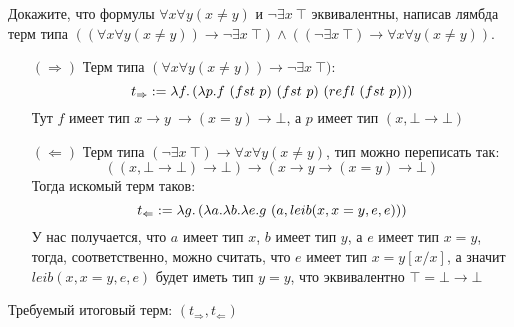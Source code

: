 \begin{task}[4]
Докажите, что формулы $\forall x \forall y (x \neq y)$ и $\neg \exists x\ \top$ эквивалентны,
написав лямбда терм типа $((\forall x \forall y (x \neq y)) \to \neg \exists x\ \top) \land ((\neg \exists x\ \top) \to \forall x \forall y (x \neq y))$.
\end{task}
\begin{solution}
\begin{enumerate}
	\item[$(\Rightarrow)$] Терм типа $(\forall x \forall y (x \neq y)) \to \neg \exists x\ \top)$:
	\[
		t_{\Rightarrow} := \lambda f.\left( \lambda p. f\ (fst\ p)\ (fst\ p)\ (refl\ (fst\ p)) \right)
	\]
	Тут $f$ имеет тип $x \to y\ \to (x = y) \to \bot$, а $p$ имеет тип $(x, \bot \to \bot)$

	\item[$(\Leftarrow)$] Терм типа $(\neg \exists x\ \top) \to \forall x \forall y (x \neq y)$, тип можно переписать так: 
	\[
		((x, \bot \to \bot) \to \bot) \to (x \to y \to (x = y) \to \bot)
	\]
	Тогда искомый терм таков:
	\[
		t_{\Leftarrow} := \lambda g.\left(  \lambda a.\lambda b.\lambda e. g\ (a, leib(x, x=y, e, e)) \right)
	\]
	У нас получается, что $a$ имеет тип $x$, $b$ имеет тип $y$, а $e$ имеет тип $x=y$, тогда, соответственно, можно считать, что $e$ имеет тип $x=y[x/x]$,
	а значит $leib(x, x=y, e, e)$ будет иметь тип $y=y$, что эквивалентно $\top = \bot \to \bot$
\end{enumerate}
Требуемый итоговый терм: $(t_{\Rightarrow}, t_{\Leftarrow})$ \xqed
\end{solution}


